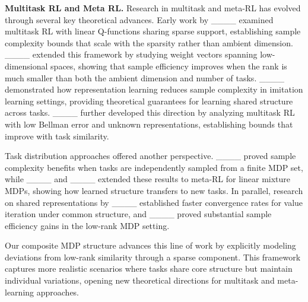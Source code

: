 \smallskip
\noindent
\textbf{Multitask RL and Meta RL.}
Research in multitask and meta-RL has evolved through several key theoretical advances. Early work by ____ examined multitask RL with linear Q-functions sharing sparse support, establishing sample complexity bounds that scale with the sparsity rather than ambient dimension. ____ extended this framework by studying weight vectors spanning low-dimensional spaces, showing that sample efficiency improves when the rank is much smaller than both the ambient dimension and number of tasks. ____ demonstrated how representation learning reduces sample complexity in imitation learning settings, providing theoretical guarantees for learning shared structure across tasks. ____ further developed this direction by analyzing multitask RL with low Bellman error and unknown representations, establishing bounds that improve with task similarity.

Task distribution approaches offered another perspective. ____ proved sample complexity benefits when tasks are independently sampled from a finite MDP set, while ____ and ____ extended these results to meta-RL for linear mixture MDPs, showing how learned structure transfers to new tasks. In parallel, research on shared representations by ____ established faster convergence rates for value iteration under common structure, and ____ proved substantial sample efficiency gains in the low-rank MDP setting.

Our composite MDP structure advances this line of work by explicitly modeling deviations from low-rank similarity through a sparse component. This framework captures more realistic scenarios where tasks share core structure but maintain individual variations, opening new theoretical directions for multitask and meta-learning approaches.
